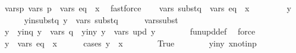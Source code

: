 \begin{isabellebody}
\ vars{\isacharunderscore}{\kern0pt}p{\isacharcolon}{\kern0pt}\ {\isachardoublequoteopen}vars\ p\ {\isasymsubseteq}\ vars\ eq\ {\isacharminus}{\kern0pt}\ {\isacharbraceleft}{\kern0pt}x{\isacharbraceright}{\kern0pt}{\isachardoublequoteclose}\ \isamarkupfalse%
\ fastforce\isanewline
\ \ \isamarkupfalse%
\ {\isachardoublequoteopen}vars\ {\isacharquery}{\kern0pt}subst{\isacharunderscore}{\kern0pt}q\ {\isasymsubseteq}\ vars\ eq\ {\isacharminus}{\kern0pt}\ {\isacharbraceleft}{\kern0pt}x{\isacharbraceright}{\kern0pt}{\isachardoublequoteclose}\isanewline
\ \ \isamarkupfalse%
\isanewline
\ \ \ \ \isamarkupfalse%
\ y\isanewline
\ \ \ \ \isamarkupfalse%
\ y{\isacharunderscore}{\kern0pt}in{\isacharunderscore}{\kern0pt}subst{\isacharunderscore}{\kern0pt}q{\isacharcolon}{\kern0pt}\ {\isachardoublequoteopen}y\ {\isasymin}\ vars\ {\isacharquery}{\kern0pt}subst{\isacharunderscore}{\kern0pt}q{\isachardoublequoteclose}\isanewline
\ \ \ \ \isamarkupfalse%
\ vars{\isacharunderscore}{\kern0pt}subst\ \isamarkupfalse%
\ y{\isacharprime}{\kern0pt}\ \ y{\isacharprime}{\kern0pt}{\isacharunderscore}{\kern0pt}in{\isacharunderscore}{\kern0pt}q{\isacharcolon}{\kern0pt}\ {\isachardoublequoteopen}y{\isacharprime}{\kern0pt}\ {\isasymin}\ vars\ q{\isachardoublequoteclose}\ \ y{\isacharunderscore}{\kern0pt}in{\isacharunderscore}{\kern0pt}y{\isacharprime}{\kern0pt}{\isacharcolon}{\kern0pt}\ {\isachardoublequoteopen}y\ {\isasymin}\ vars\ {\isacharparenleft}{\kern0pt}{\isacharquery}{\kern0pt}upd\ y{\isacharprime}{\kern0pt}{\isacharparenright}{\kern0pt}{\isachardoublequoteclose}\isanewline
\ \ \ \ \ \ \isamarkupfalse%
\ fun{\isacharunderscore}{\kern0pt}upd{\isacharunderscore}{\kern0pt}def\ \isamarkupfalse%
\ force\isanewline
\ \ \ \ \isamarkupfalse%
\ {\isachardoublequoteopen}y\ {\isasymin}\ vars\ eq\ {\isacharminus}{\kern0pt}\ {\isacharbraceleft}{\kern0pt}x{\isacharbraceright}{\kern0pt}{\isachardoublequoteclose}\isanewline
\ \ \ \ \isamarkupfalse%
\ {\isacharparenleft}{\kern0pt}cases\ {\isachardoublequoteopen}y{\isacharprime}{\kern0pt}\ {\isacharequal}{\kern0pt}\ x{\isachardoublequoteclose}{\isacharparenright}{\kern0pt}\isanewline
\ \ \ \ \ \ \isamarkupfalse%
\ True\isanewline
\ \ \ \ \ \ \isamarkupfalse%
\ y{\isacharunderscore}{\kern0pt}in{\isacharunderscore}{\kern0pt}y{\isacharprime}{\kern0pt}\ x{\isacharunderscore}{\kern0pt}not{\isacharunderscore}{\kern0pt}in{\isacharunderscore}{\kern0pt}p\ \isamarkupfalse%

\end{isabellebody}
